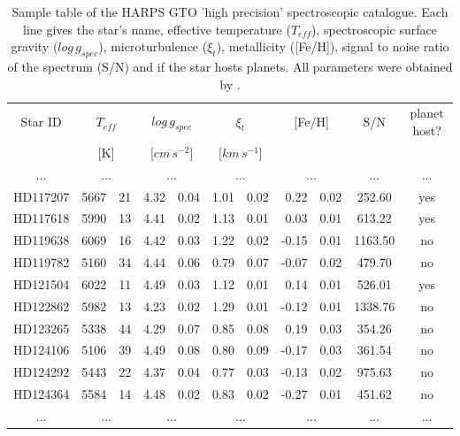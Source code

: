 \documentclass[dvips,12pt,a4paper]{report}
\begin{document}
{\begin{table}[h]
  \centering
\caption[Sample table of the HARPS GTO ``high precision'' spectroscopic catalogue.]{Sample table of the HARPS GTO 'high precision' spectroscopic catalogue. Each line gives the star's name, effective temperature ($T_{eff}$), spectroscopic surface gravity ($log\,g_{spec}$), microturbulence ($\xi_t$), metallicity ([Fe/H]), signal to noise ratio of the spectrum (S/N) and if the star hosts planets. All parameters were obtained by \citet{Sousa-2008}.}
  \label{cat_sample}
  \begin{tabular}{ c r@{$\pm$}l r@{$\pm$}l r@{$\pm$}l r@{$\pm$}l c c}
  \hline
  \hline
Star ID & \multicolumn {2}{c}{$T_{eff}$} & \multicolumn {2}{c}{$log\,g_{spec}$} & \multicolumn {2}{c}{$\xi_t$} & \multicolumn {2}{c}{[Fe/H]} & S/N & planet host? \\ 
& \multicolumn {2}{c}{[K]} & \multicolumn {2}{c}{[$cm\,s^{-2}$]} & \multicolumn {2}{c}{[$km\,s^{-1}$]} & \multicolumn {2}{c}{ } &  &  \\
\hline
... & \multicolumn {2}{c}{...} & \multicolumn {2}{c}{...} & \multicolumn {2}{c}{...} & \multicolumn {2}{c}{...} & ... & ... \\
HD117207 & 5667 & 21 & 4.32 & 0.04 & 1.01 & 0.02 & 0.22 & 0.02 & 252.60 & yes \\
HD117618 & 5990 & 13 & 4.41 & 0.02 & 1.13 & 0.01 & 0.03 & 0.01 & 613.22 & yes \\
HD119638 & 6069 & 16 & 4.42 & 0.03 & 1.22 & 0.02 & -0.15 & 0.01 & 1163.50 & no \\
HD119782 & 5160 & 34 & 4.44 & 0.06 & 0.79 & 0.07 & -0.07 & 0.02 & 479.70 & no \\
HD121504 & 6022 & 11 & 4.49 & 0.03 & 1.12 & 0.01 & 0.14 & 0.01 & 526.01 & yes \\
HD122862 & 5982 & 13 & 4.23 & 0.02 & 1.29 & 0.01 & -0.12 & 0.01 & 1338.76 & no \\
HD123265 & 5338 & 44 & 4.29 & 0.07 & 0.85 & 0.08 & 0.19 & 0.03 & 354.26 & no \\
HD124106 & 5106 & 39 & 4.49 & 0.08 & 0.80 & 0.09 & -0.17 & 0.03 & 361.54 & no \\
HD124292 & 5443 & 22 & 4.37 & 0.04 & 0.77 & 0.03 & -0.13 & 0.02 & 975.63 & no \\
HD124364 & 5584 & 14 & 4.48 & 0.02 & 0.83 & 0.02 & -0.27 & 0.01 & 451.62 & no \\
... & \multicolumn {2}{c}{...} & \multicolumn {2}{c}{...} & \multicolumn {2}{c}{...} & \multicolumn {2}{c}{...} & ... & ... \\
\hline
\end{tabular}
\end{table}

}
\end{document}
